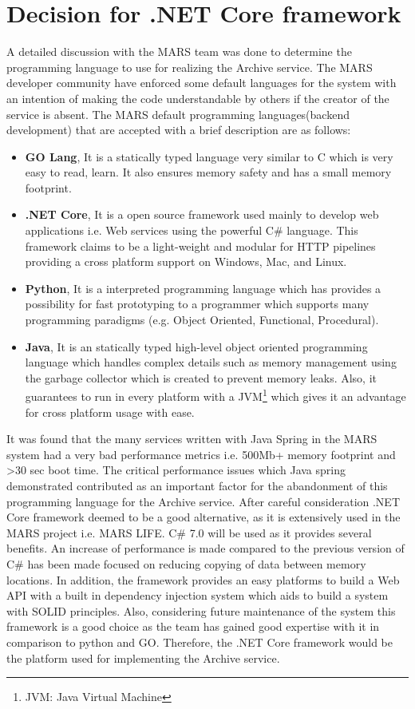 \section{Decision for .NET Core framework}
\label{sec:dotnet}
A detailed discussion with the MARS team was done to determine the programming language to use for realizing the Archive service. The MARS developer community 
have enforced some default languages for the system with an intention of making the code understandable by others if the creator of the service is absent.
The MARS default programming languages(backend development) that are accepted with a brief description are as follows:
\begin{itemize}
    \item \textbf{GO Lang}, It is a statically typed language very similar to C which is very easy to read, learn. It also ensures memory safety and has
    a small memory footprint.
    \item \textbf{.NET Core}, It is a open source framework used mainly to develop web applications i.e. Web services using the powerful C\# language. This framework 
    claims to be a light-weight and modular for HTTP pipelines providing a cross platform support on Windows, Mac, and Linux.
    \item \textbf{Python}, It is a interpreted programming language which has provides a possibility for fast prototyping to a programmer which supports many 
    programming paradigms (e.g. Object Oriented, Functional, Procedural).
    \item \textbf{Java}, It is an statically typed high-level object oriented programming language which handles complex details such as memory management using the
    garbage collector which is created to prevent memory leaks. Also, it guarantees to run in every platform with a JVM\footnote{JVM: Java Virtual Machine} which 
    gives it an advantage for cross platform usage with ease. 
\end{itemize}
 
It was found that the many services written with Java Spring in the MARS system had a very bad performance metrics i.e. 500Mb+ memory footprint and >30 sec boot time.
The critical performance issues which Java spring demonstrated contributed as an important factor for the abandonment of this programming language for the Archive service. After careful 
consideration .NET Core framework deemed to be a good alternative, as it is extensively used in the MARS project i.e. MARS LIFE. C\# 7.0 will be used as it provides
several benefits. An increase of performance is made compared to the previous version of C\# has been made focused on reducing copying of data between memory locations.
In addition, the framework provides an easy platforms to build a Web API with a built in dependency injection system which aids to build a system with
SOLID \cite{Hotop2015} principles. Also, considering future maintenance of the system this framework is a good choice as the team has gained good expertise with it in comparison
to python and GO. Therefore, the .NET Core framework would be the platform used for implementing the Archive service.
